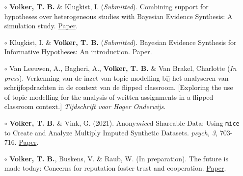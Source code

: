 \documentclass[11pt,a4paper,roman,colorlinks,linkcolor = blue]{moderncv}        %
\begin{document}
\begin{itemize}

\item[$\circ$]\textbf{Volker, T. B.} \& Klugkist, I. (\textit{Submitted}). Combining support for hypotheses over heterogeneous studies with Bayesian Evidence Synthesis: A simulation study. \href{https://github.com/thomvolker/bes_master_thesis_ms/blob/main/manuscript_VK/manuscript_VK.pdf}{Paper}.

\item[$\circ$] Klugkist, I. \& \textbf{Volker, T. B.} (\textit{Submitted}). Bayesian Evidence Synthesis for Informative Hypotheses: An introduction. \href{https://github.com/thomvolker/bes-intro-paper/blob/main/bes_intro_paper.pdf}{Paper}.

\item[$\circ$] Van Leeuwen, A., Bagheri, A., \textbf{Volker, T. B.} \& Van Brakel, Charlotte (\textit{In press}). Verkenning van de inzet van topic modelling bij het analyseren van schrijfopdrachten in de context van de flipped classroom. [Exploring the use of topic modelling for the analysis of written assignments in a flipped classroom context.] \textit{Tijdschrift voor Hoger Onderwijs}. 

\item[$\circ$] \textbf{Volker, T. B.} \& Vink, G. (2021). Anony\textit{mice}d Shareable Data: Using \texttt{mice} to Create and Analyze Multiply Imputed Synthetic Datasets. \textit{psych, 3}, 703-716. \href{https://www.mdpi.com/2624-8611/3/4/45}{Paper}.

\item[$\circ$] \textbf{Volker, T. B.}, Buskens, V. \& Raub, W. (In preparation). The future is made today: Concerns for reputation foster trust and cooperation. \href{https://github.com/thomvolker/bes_master_thesis_sasr/blob/main/thesis/thesis_volker.pdf}{Paper}.
\end{itemize}

% 

\end{document}
